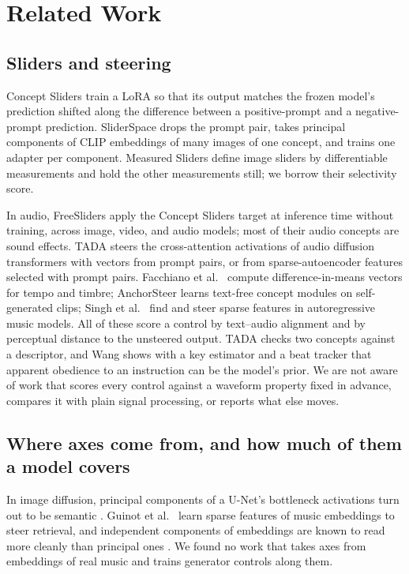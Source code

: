 \section{Related Work}

\subsection{Sliders and steering}

Concept Sliders \citep{gandikota2024sliders} train a LoRA \citep{hu2022lora} so that its output matches the frozen model's prediction shifted along the difference between a positive-prompt and a negative-prompt prediction. SliderSpace \citep{gandikota2025sliderspace} drops the prompt pair, takes principal components of CLIP embeddings of many images of one concept, and trains one adapter per component. Measured Sliders \citep{chen2026measured} define image sliders by differentiable measurements and hold the other measurements still; we borrow their selectivity score.

In audio, FreeSliders \citep{ezra2025freesliders} apply the Concept Sliders target at inference time without training, across image, video, and audio models; most of their audio concepts are sound effects. TADA \citep{staniszewski2026tada} steers the cross-attention activations of audio diffusion transformers with vectors from prompt pairs, or from sparse-autoencoder features selected with prompt pairs. Facchiano et al.~\citep{facchiano2025patching} compute difference-in-means vectors for tempo and timbre; AnchorSteer \citep{chang2026anchorsteer} learns text-free concept modules on self-generated clips; Singh et al.~\citep{singh2026discovering} find and steer sparse features in autoregressive music models. All of these score a control by text--audio alignment and by perceptual distance to the unsteered output. TADA checks two concepts against a descriptor, and Wang \citep{wang2026counterfactual} shows with a key estimator and a beat tracker that apparent obedience to an instruction can be the model's prior. We are not aware of work that scores every control against a waveform property fixed in advance, compares it with plain signal processing, or reports what else moves.

\subsection{Where axes come from, and how much of them a model covers}

In image diffusion, principal components of a U-Net's bottleneck activations turn out to be semantic \citep{kwon2023hspace,haas2024directions}. Guinot et al.~\citep{guinot2026steering} learn sparse features of music embeddings to steer retrieval, and independent components of embeddings are known to read more cleanly than principal ones \citep{yamagiwa2023ica}. We found no work that takes axes from embeddings of real music and trains generator controls along them.


